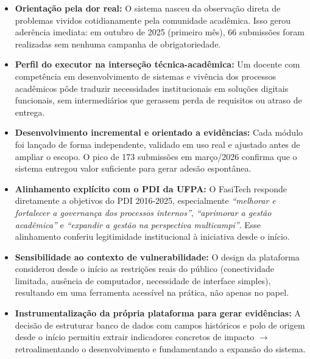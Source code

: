 \documentclass[12pt,a4paper]{article}
\begin{document}
\begin{itemize}[label={\color{darkgreen}\faStar}, itemsep=2pt]
  \item \textbf{Orientação pela dor real:} O sistema nasceu da observação direta de
    problemas vividos cotidianamente pela comunidade acadêmica. Isso gerou aderência
    imediata: em outubro de 2025 (primeiro mês), 66 submissões foram realizadas sem
    nenhuma campanha de obrigatoriedade.

  \item \textbf{Perfil do executor na interseção técnica-acadêmica:} Um docente com
    competência em desenvolvimento de sistemas e vivência dos processos acadêmicos pôde
    traduzir necessidades institucionais em soluções digitais funcionais, sem
    intermediários que gerassem perda de requisitos ou atraso de entrega.

  \item \textbf{Desenvolvimento incremental e orientado a evidências:} Cada módulo
    foi lançado de forma independente, validado em uso real e ajustado antes de ampliar
    o escopo. O pico de 173 submissões em março/2026 confirma que o sistema
    entregou valor suficiente para gerar adesão espontânea.

  \item \textbf{Alinhamento explícito com o PDI da UFPA:} O FasiTech responde
    diretamente a objetivos do PDI 2016-2025, especialmente \textit{``melhorar e
    fortalecer a governança dos processos internos''}, \textit{``aprimorar a gestão
    acadêmica''} e \textit{``expandir a gestão na perspectiva multicampi''}. Esse
    alinhamento conferiu legitimidade institucional à iniciativa desde o início.

  \item \textbf{Sensibilidade ao contexto de vulnerabilidade:} O design da plataforma
    considerou desde o início as restrições reais do público (conectividade limitada,
    ausência de computador, necessidade de interface simples), resultando em uma
    ferramenta acessível na prática, não apenas no papel.

  \item \textbf{Instrumentalização da própria plataforma para gerar evidências:} A
    decisão de estruturar banco de dados com campos históricos e polo de origem desde o
    início permitiu extrair indicadores concretos de impacto $\rightarrow$ retroalimentando o
    desenvolvimento e fundamentando a expansão do sistema.
\end{itemize}
\end{document}
